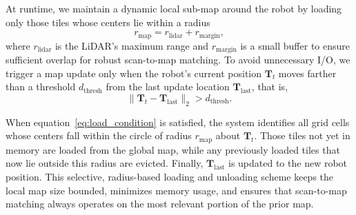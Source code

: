 At runtime, we maintain a dynamic local sub-map around the robot by loading only those tiles whose centers lie within a radius
\begin{equation}
	\label{eq:rmap}
	r_{\mathrm{map}} = r_{\mathrm{lidar}} + r_{\mathrm{margin}},
\end{equation}
where \(r_{\mathrm{lidar}}\) is the LiDAR’s maximum range and \(r_{\mathrm{margin}}\) is a small buffer to ensure sufficient overlap for robust scan-to-map matching. To avoid unnecessary I/O, we trigger a map update only when the robot’s current position \(\mathbf{T}_t\) moves farther than a threshold \(d_{\mathrm{thresh}}\) from the last update location \(\mathbf{T}_{\mathrm{last}}\), that is,
\begin{equation}
	\label{eq:load_condition}
	\|\mathbf{T}_t - \mathbf{T}_{\mathrm{last}}\|_2 > d_{\mathrm{thresh}}.
\end{equation}

When equation~\ref{eq:load_condition} is satisfied, the system identifies all grid cells whose centers fall within the circle of radius \(r_{\mathrm{map}}\) about \(\mathbf{T}_t\). Those tiles not yet in memory are loaded from the global map, while any previously loaded tiles that now lie outside this radius are evicted. Finally, \(\mathbf{T}_{\mathrm{last}}\) is updated to the new robot position. This selective, radius-based loading and unloading scheme keeps the local map size bounded, minimizes memory usage, and ensures that scan-to-map matching always operates on the most relevant portion of the prior map.

